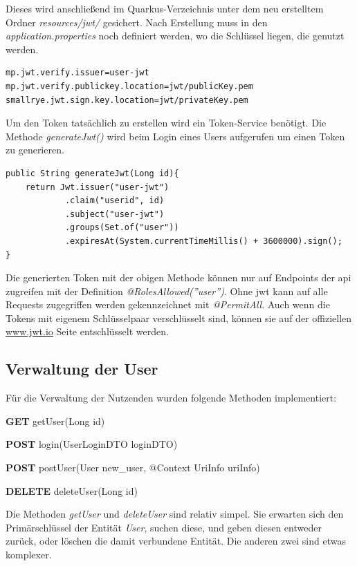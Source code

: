 Dieses wird anschließend im Quarkus-Verzeichnis unter dem neu erstelltem Ordner \emph{resources/jwt/} gesichert. 
Nach Erstellung muss in den \emph{application.properties} noch definiert werden, wo die Schlüssel liegen, die genutzt werden. \cite{jwtAboutQuarkus}
\begin{lstlisting}[label=lst:jwtkonf, caption=JWT Konfigurationen in application.properties]
mp.jwt.verify.issuer=user-jwt
mp.jwt.verify.publickey.location=jwt/publicKey.pem
smallrye.jwt.sign.key.location=jwt/privateKey.pem    
\end{lstlisting}

Um den Token tatsächlich zu erstellen wird ein Token-Service benötigt. 
Die Methode \emph{generateJwt()} wird beim Login eines Users aufgerufen um einen Token zu generieren.
\begin{lstlisting}[label=lst:jwtSign, caption=Methode zum signen von Tokens in JWT-Service]
public String generateJwt(Long id){
    return Jwt.issuer("user-jwt")
            .claim("userid", id)
            .subject("user-jwt")
            .groups(Set.of("user"))
            .expiresAt(System.currentTimeMillis() + 3600000).sign();
}
\end{lstlisting}

Die generierten Token mit der obigen Methode können nur auf Endpoints der \gls{api} zugreifen mit der Definition \emph{@RolesAllowed(''user'')}. 
Ohne \gls{jwt} kann auf alle Requests zugegriffen werden gekennzeichnet mit \emph{@PermitAll}. 
Auch wenn die Tokens mit eigenem Schlüsselpaar verschlüsselt sind, können sie auf der offiziellen \href{https://jwt.io}{www.jwt.io} Seite entschlüsselt werden. \cite{JWTAbout}

\subsection{Verwaltung der User}
Für die Verwaltung der Nutzenden wurden folgende Methoden implementiert:
\begin{compactitem}
    \item \textbf{GET} getUser(Long id)
    \item \textbf{POST} login(UserLoginDTO loginDTO)
    \item \textbf{POST} postUser(User new\_user, @Context UriInfo uriInfo)
    \item \textbf{DELETE} deleteUser(Long id)
\end{compactitem}

Die Methoden \emph{getUser} und \emph{deleteUser} sind relativ simpel. 
Sie erwarten sich den Primärschlüssel der Entität \emph{User}, suchen diese, und geben diesen entweder zurück, oder löschen die damit verbundene Entität.
Die anderen zwei sind etwas komplexer. 

